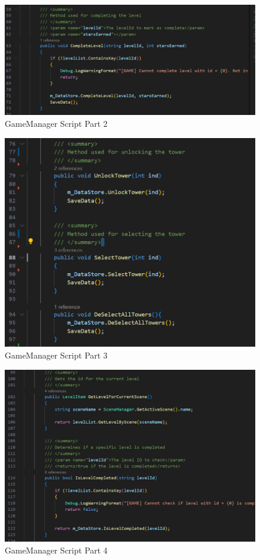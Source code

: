 \documentclass[12pt,a4paper]{report}
\begin{document}
\begin{figure}[h!]
	\centering
	\includegraphics[scale=0.75]{images/GameManager2.png}
	\caption{GameManager Script Part 2}
	\label{fig:GameManager2}
\end{figure}

\begin{figure}[h!]
	\centering
	\includegraphics[scale=0.75]{images/GameManager3.png}
	\caption{GameManager Script Part 3}
	\label{fig:GameManager3}
\end{figure}

\begin{figure}[h!]
	\centering
	\includegraphics[scale=0.75]{images/GameManager4.png}
	\caption{GameManager Script Part 4}
	\label{fig:GameManager4}
\end{figure}
\end{document}

